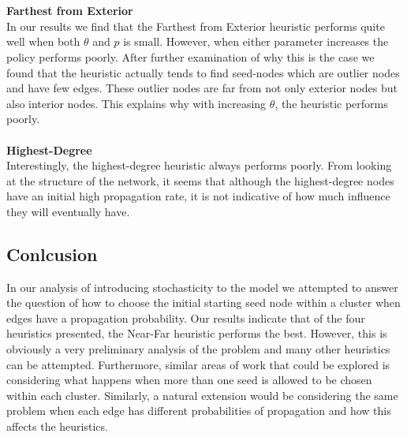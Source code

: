 \documentclass{article}
\begin{document}
\\ \\
\textbf{ Farthest from Exterior} \\
In our results we find that the Farthest from Exterior heuristic performs quite well when both $\theta$ and $p$ is small. However, when either parameter increases the policy performs poorly. After further examination of why this is the case we found that the heuristic actually tends to find seed-nodes which are outlier nodes and have few edges. These outlier nodes are far from not only exterior nodes but also interior nodes. This explains why with increasing $\theta$, the heuristic performs poorly. 
\\ \\
\textbf{ Highest-Degree} \\
Interestingly, the highest-degree heuristic always performs poorly. From looking at the structure of the network, it seems that although the highest-degree nodes have an initial high propagation rate, it is not indicative of how much influence they will eventually have. 

\subsection{Conlcusion}
In our analysis of introducing stochasticity to the model we attempted to answer the question of how to choose the initial starting seed node within a cluster when edges have a propagation probability. Our results indicate that of the four heuristics presented, the Near-Far heuristic performs the best. However, this is obviously a very preliminary analysis of the problem and many other heuristics can be attempted. Furthermore, similar areas of work that could be explored is considering what happens when more than one seed is allowed to be chosen within each cluster. Similarly, a natural extension would be considering the same problem when each edge has different probabilities of propagation and how this affects the heuristics. 
\end{document}
